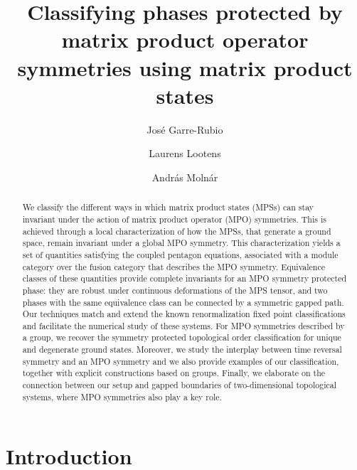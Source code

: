 \documentclass[a4paper,twocolumn,11pt,accepted=2023-02-10]{quantumarticle}
\begin{document}
\title{Classifying phases protected by matrix product operator symmetries using matrix product states}

\author{ Jos\'e Garre-Rubio}

\author{Laurens Lootens}

\author{ Andr\'as Moln\'ar}



\begin{abstract}

We classify the different ways in which matrix product states (MPSs) can stay invariant under the action of matrix product operator (MPO) symmetries. This is achieved through a local characterization of how the MPSs, that generate a ground space, remain invariant under a global MPO symmetry. This characterization yields a set of quantities satisfying the coupled pentagon equations, associated with a module category over the fusion category that describes the MPO symmetry. Equivalence classes of these quantities provide complete invariants for an MPO symmetry protected phase: they are robust under continuous deformations of the MPS tensor, and two phases with the same equivalence class can be connected by a symmetric gapped path. Our techniques match and extend the known renormalization fixed point classifications and facilitate the numerical study of these systems. For MPO symmetries described by a group, we recover the symmetry protected topological order classification for unique and degenerate ground states. Moreover, we study the interplay between time reversal symmetry and an MPO symmetry and we also provide examples of our classification, together with explicit constructions based on groups. Finally, we elaborate on the connection between our setup and gapped boundaries of two-dimensional topological systems, where MPO symmetries also play a key role.
\end{abstract}


\maketitle

\section{Introduction}
\end{document}
